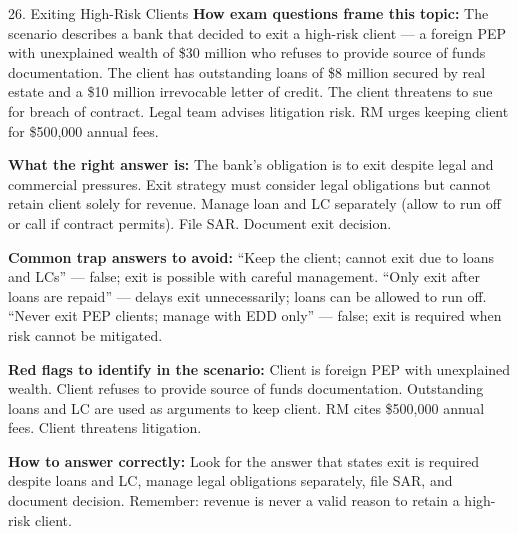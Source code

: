 \documentclass[11pt,a4paper]{beamer}
\begin{document}
	\begin{frame}{26. Exiting High-Risk Clients}
		\tiny
		\noindent\textbf{How exam questions frame this topic:} The scenario describes a bank that decided to exit a high-risk client — a foreign PEP with unexplained wealth of \$30 million who refuses to provide source of funds documentation. The client has outstanding loans of \$8 million secured by real estate and a \$10 million irrevocable letter of credit. The client threatens to sue for breach of contract. Legal team advises litigation risk. RM urges keeping client for \$500,000 annual fees.
		
		\vspace{0.1cm}
		\noindent\textbf{What the right answer is:} The bank's obligation is to exit despite legal and commercial pressures. Exit strategy must consider legal obligations but cannot retain client solely for revenue. Manage loan and LC separately (allow to run off or call if contract permits). File SAR. Document exit decision.
		
		\vspace{0.1cm}
		\noindent\textbf{Common trap answers to avoid:} “Keep the client; cannot exit due to loans and LCs” — false; exit is possible with careful management. “Only exit after loans are repaid” — delays exit unnecessarily; loans can be allowed to run off. “Never exit PEP clients; manage with EDD only” — false; exit is required when risk cannot be mitigated.
		
		\vspace{0.1cm}
		\noindent\textbf{Red flags to identify in the scenario:} Client is foreign PEP with unexplained wealth. Client refuses to provide source of funds documentation. Outstanding loans and LC are used as arguments to keep client. RM cites \$500,000 annual fees. Client threatens litigation.
		
		\vspace{0.1cm}
		\noindent\textbf{How to answer correctly:} Look for the answer that states exit is required despite loans and LC, manage legal obligations separately, file SAR, and document decision. Remember: revenue is never a valid reason to retain a high-risk client.
	\end{frame}
	
\end{document}
